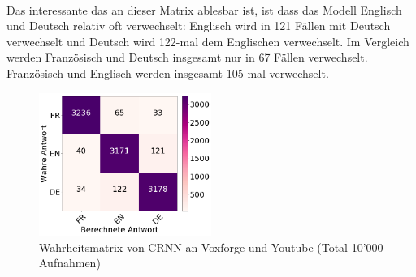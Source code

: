 \\
Das interessante das an dieser Matrix ablesbar ist, ist dass das Modell Englisch und Deutsch relativ oft verwechselt: Englisch wird in 121 Fällen mit Deutsch verwechselt und Deutsch wird 122-mal dem Englischen verwechselt. Im Vergleich werden Französisch und Deutsch insgesamt nur in 67 Fällen verwechselt. Französisch und Englisch werden insgesamt 105-mal verwechselt.
 \begin{figure}[hbt]
	\centering
		\includegraphics[width=0.5\textwidth]{assets/matrix_voxyou_crnn.png}
	\caption{Wahrheitsmatrix von CRNN an Voxforge und Youtube (Total 10'000 Aufnahmen)}
	\label{img:matrix_vox}
\end{figure}

